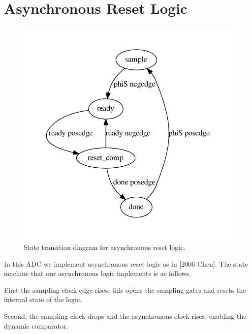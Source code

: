 \documentclass[10pt,journal]{IEEEtran}\usepackage{longtable}
\begin{document}



\section{Asynchronous Reset Logic}

\begin{figure}[tbph]
\begin{center}
\includegraphics[width=1\columnwidth]{async.pdf}
\caption{State transition diagram for asynchronous reset logic.}
\label{fig:AsyncStateMachine}
\end{center}
\end{figure}


In this ADC we implement asynchronous reset logic as in [2006 Chen]. The state machine that our asynchronous logic implements is as follows.

First the sampling clock edge rises, this opens the sampling gates and resets the internal state of the logic.

Second, the sampling clock drops and the asynchronous clock rises, enabling the dynamic comparator.
\end{document}
